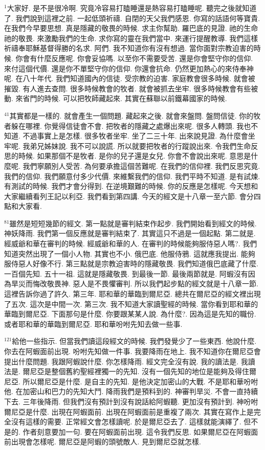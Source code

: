 \documentclass{book}
\begin{document}
$^{1}$大家好.
是不是很冷啊.
究竟冷容易打瞌睡還是熱容易打瞌睡呢.
聽完之後就知道了.
我們說到這裡之前.
一起低頭祈禱.
自閉的天父我們感恩.
你寫的話語何等寶貴.
在我們今早要思想.
真是隱藏的敬畏的時候.
求主你幫助.
羅巴底的見證.
祂的生命 祂的敬畏.
來激勵我們的生命.
求你寫的靈在我們當中.
來運行提醒教導.
我們這樣祈禱奉耶穌基督得勝的名求.
阿們.
我不知道你有沒有想過.
當你面對宗教迫害的時候.
你會有什麼反應呢.
你會妥協嗎.
以至你不需要受苦.
還是你會堅守你的信仰.
來付這個代價.
還是你不單堅守你的信仰.
你還會抗命.
仍然更加熱心的來侍奉神呢.
在八十年代.
我們知道國內的信徒.
受宗教的迫害.
家庭教會很多時候.
就會被摧毀.
有人進去查問.
很多時候教會的牧者.
就會被抓去坐牢.
很多時候教會有些被動.
來省門的時候.
可以把牧師藏起來.
其實在蘇聯以前鐵幕國家的時候.

$^{41}$其實都是一樣的.
就會產生一個問題.
藏起來之後.
就會來盤問.
盤問信徒.
你的牧者躲在哪裡.
你覺得信徒會不會.
把牧者的隱藏之處爆出來呢.
很多人轉頭.
我也不知道.
不過事實上是怎樣.
很多牧者坐牢.
坐了二三十年.
出來說見證.
為什麼會坐牢呢.
我弟兄姊妹說.
我不可以說謊.
所以就要把牧者的行蹤說出來.
令我們生命反思的時候.
如果那個不是牧者.
是你的兒子還是女兒.
你會不會說出來呢.
意思是什麼呢.
我們寧願別人受苦.
為何要承擔這個苦難呢.
在我們的信仰裡.
我們反思究竟.
我們的信仰.
我們願意付多少代價.
來維繫我們的信仰.
我們平時不知道.
是有試煉.
有測試的時候.
我們才會分得到.
在逆境艱難的時候.
你的反應是怎樣呢.
今天想和大家繼續看列王記以利亞.
我們看到第四講.
今天的經文是十八章一至六節.
會分四點和大家看.

$^{81}$雖然是短短幾節的經文.
第一點就是審判結束作起步.
我們開始看到經文的時候.
神妖降雨.
我們第一個反應就是審判結束了.
其實這只不過是一個起點.
第二就是.
經威爺和華在審判的時候.
經威爺和華的人.
在審判的時候能夠服侍惡人嗎?.
我們知道突然出現了一個小人物.
其實也不小.
俄巴底.
他服侍鴉.
這就應我提出.
能夠服侍惡人好像不行.
第三點就是宗教迫害時的隱藏敬畏.
我們知道俄巴底藏了什麼.
一百個先知.
五十一祖.
這就是隱藏敬畏.
到最後一節.
最後兩節就是.
阿蝦沒有因為旱災而悔改敬畏神.
惡人是不畏懼審判.
所以我們起步點的經文就是十八章一節.
這裡告訴你過了許久.
第三年.
耶和華的華臨到爾尼亞.
總共在爾尼亞的經文裡出現了五次.
這次是中間一次.
第三次.
我不知道大家讀聖經的時候.
當你看到耶和華的華臨到爾尼亞.
下面那句是什麼.
你要跟某某人說.
為什麼?.
因為這是先知的職份.
或者耶和華的華臨到爾尼亞.
耶和華吩咐先知去做一些事.

$^{121}$給他一些指示.
但當我們讀這段經文的時候.
我們發覺少了一些東西.
他說什麼.
你去在阿蝦面前出現.
吩咐先知做一件事.
我要降雨在地上.
我不知道你在爾尼亞會提出什麼問題.
我跟阿蝦說什麼.
你怎樣降雨.
經文完全沒有說.
我的讀法是.
我讀法是.
爾尼亞是整個舊約聖經裡獨一的先知.
沒有一個先知的地位是能夠及得住爾尼亞.
所以爾尼亞是什麼.
是自主的先知.
是他決定加密山的大戰.
不是耶和華吩咐他.
在加密山和巴力的先知大鬥.
降雨我們是預料到的.
神審判旱災.
不會一直持續下去.
三年後降雨.
但我們沒有預計到沒有說話給阿蝦聽.
更加沒有預計到.
神吩咐爾尼亞是什麼.
出現在阿蝦面前.
出現在阿蝦面前是重複了兩次.
其實在寫作上是完全沒有這樣的需要.
正常經文會怎樣讀呢.
於是爾尼亞去了.
這樣就能演繹了.
但不是的.
作者刻意要加一句.
要在阿蝦面前出現.
這令我們反思.
如果爾尼亞在阿蝦面前出現會怎樣呢.
爾尼亞是阿蝦的頭號敵人.
見到爾尼亞就怎樣.
\end{document}

